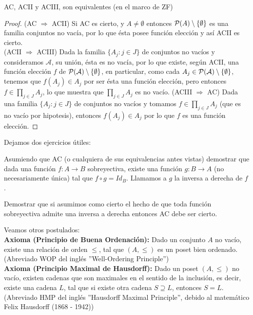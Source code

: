 \documentclass[12pt,a4paper]{book}
\begin{document}
\begin{prop} %
AC, ACII y ACIII, son equivalentes (en el marco de ZF)
\begin{proof}
(AC $\Rightarrow$ ACII) Si AC es cierto, y $A\neq \emptyset$ entonces $\P(A) \setminus \{\emptyset\}$ es una familia conjuntos no vacía, por lo que ésta posee función elección y así ACII es cierto.\\
(ACII $\Rightarrow$ ACIII) Dada la familia $\{A_j : j \in J\}$ de conjuntos no vacíos y consideramos $\mathcal{A}$, su unión, ésta es no vacía, por lo que existe, según ACII, una función elección $f$ de $\P(\mathcal{A}) \setminus \{\emptyset\}$, en particular, como cada $A_j \in \P(\mathcal{A}) \setminus \{\emptyset\}$, tenemos que $f(A_j) \in A_j$ por ser ésta una función elección, pero entonces $f \in \prod_{j \in J} A_j$, lo que muestra que $\prod_{j \in J} A_j$ es no vacío.
(ACIII $\Rightarrow$ AC) Dada una familia $\{A_j : j \in J\}$ de conjuntos no vacíos y tomamos $f \in \prod_{j \in J} A_j$ (que es no vacío por hipotesis), entonces $f(A_j) \in A_j$ por lo que $f$ es una función elección.
\end{proof}
\end{prop}
Dejamos dos ejercicios útiles:
\begin{ej} Asumiendo que AC (o cualquiera de sus equivalencias antes vistas) demostrar que dada una función $f: A \rightarrow B$ sobreyectiva, existe una función $g:B \rightarrow A$ (no necesariamente única) tal que $f \circ g = Id_B$. Llamamos a $g$ la inversa a derecha de $f$.
\end{ej}
\begin{ej}
Demostrar que si asumimos como cierto el hecho de que toda función sobreyectiva admite una inversa a derecha entonces AC debe ser cierto.
\end{ej}
Veamos otros postulados: \\[0.5cm]
\textbf{Axioma (Principio de Buena Ordenación):} Dado un conjunto $A$ no vacío, existe una relación de orden $\leq$, tal que $(A,\leq)$ es un poset bien ordenado. (Abreviado WOP del inglés ''Well-Ordering Principle'')\\[0.5cm]
\textbf{Axioma (Principio Maximal de Hausdorff):} Dado un poset $(A,\leq)$ no vacío, existen cadenas que son maximales en el sentido de la inclusión, es decir, existe una cadena $L$, tal que si existe otra cadena $S \supseteq L$, entonces $S = L$. (Abreviado HMP del inglés ''Hausdorff Maximal Principle'', debido al matemático Felix Hausdorff (1868 - 1942))\\[0.5cm]
\end{document}

